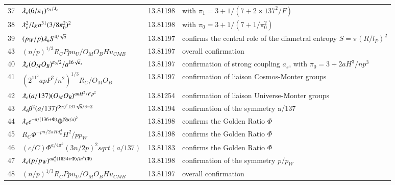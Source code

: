 \documentclass[a4paper,9pt]{article}
\begin{document}
\begin{appendix}
\begin{table}
\begin{tabular}{llll}
    37 & $\lambdabar_{e} (6/\pi_1)^{r_H/\lambdabar_e} $ & 13.81198 & with $\pi_1 = 3 + 1/ (7+2\times137^2/F)$ \\
    38 & $\lambdabar_{e}^2/l_K  a^{31} (3/8\pi_0^2)^2 $ & 13.81198 & with $\pi_0 = 3 + 1/ (7+1/\pi_0^2)$ \\
    39 & $(p_W/p) \lambdabar_{n} S^{4/\sqrt a}   $ & 13.81197 & confirms the central role of the diametral entropy  $ S = \pi (R/l_P)^2$ \\ 43 & $  (n/p)^{1/3} R_C Ppu_U/O_M O_B H u_{CMB}   $ & 13.81197 & overall confirmation  \\
    
    
     40 & $ \lambdabar_{e} (O_M O_B)^{\pi_0 /2} /a^{16\sqrt a_s}   $ & 13.81197 & confirmation of strong coupling $a_s$, with $\pi_0 = 3 +2aH^3/np^3$  \\
    
    
     41 & $  (2^{11^2} a p P^2/n^2)^{1/3} R_C/O_M O_B   $ & 13.81197 & confirmation of liaison Cosmos-Monter groups  \\
     
     
       42 & $ \lambdabar_{e} (a/137) (O_M O_B)^{anH^2/Fp^2}   $ & 13.81254 & confirmation of liaison Universe-Monter groups  \\
    
    
    43 & $ \lambdabar_{e} \beta^2 (a/137)^{(8\pi)^2 137 \sqrt a/3 -2}   $ & 13.81194 & confirmation of the symmetry a/137  \\
    
    
    44 & $ \lambdabar_{e} e^{-\pi/(136+\Phi)} \Phi^{(9\mu /a)^2}   $ & 13.81198 & confirms the Golden Ratio $\Phi$ \\
    
    
    45 & $ R_C \Phi^{-pn/2\pi Hd_e^4} H^2/pp_W   $ & 13.81198 & confirms the Golden Ratio $\Phi$ \\
   
   
   
   
    
   46& $ (c/C) \Phi^{a/4\pi^2} (3n/2p)^2 sqrt(a/137)  $ & 13.81183 & confirms the Golden Ratio $\Phi$ \\ 
    
    
    
    
    47 & $ \lambdabar_{e} (p/p_W)^{ad_e^4(1834+\Phi)/ln^4(\Phi)}   $ & 13.81198 & confirmation of the symmetry $p/p_W$  \\
    
    
    48 & $  (n/p)^{1/3} R_C Ppu_U/O_M O_B H u_{CMB}   $ & 13.81197 & overall confirmation  \\
    

\end{tabular}
\end{table}
\end{appendix}
\end{document}
